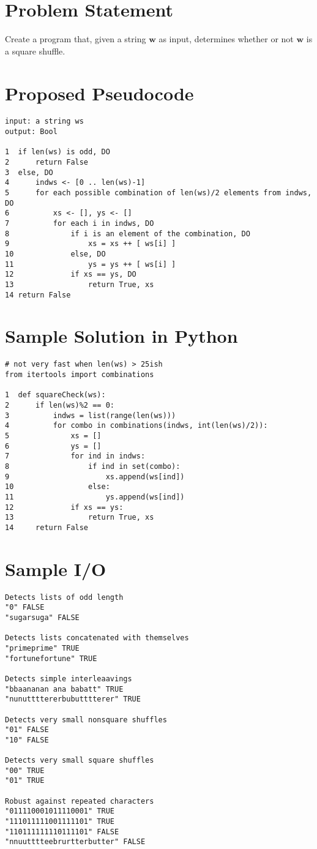 \documentclass{article}[12pt]
\begin{document}
\section{Problem Statement}

Create a program that, given a string $\mathbf{w}$ as input, determines whether or not $\mathbf{w}$ is a square shuffle.


\newpage \section{Proposed Pseudocode}

\begin{verbatim}
input: a string ws
output: Bool

1  if len(ws) is odd, DO
2      return False
3  else, DO
4      indws <- [0 .. len(ws)-1]
5      for each possible combination of len(ws)/2 elements from indws, DO
6          xs <- [], ys <- []
7          for each i in indws, DO
8              if i is an element of the combination, DO
9                  xs = xs ++ [ ws[i] ]
10             else, DO
11                 ys = ys ++ [ ws[i] ]
12             if xs == ys, DO
13                 return True, xs
14 return False
\end{verbatim}


\section{Sample Solution in Python}

\begin{verbatim}
# not very fast when len(ws) > 25ish
from itertools import combinations

1  def squareCheck(ws):
2      if len(ws)%2 == 0:
3          indws = list(range(len(ws)))
4          for combo in combinations(indws, int(len(ws)/2)):
5              xs = []
6              ys = []
7              for ind in indws:
8                  if ind in set(combo):
9                      xs.append(ws[ind])
10                 else:
11                     ys.append(ws[ind])
12             if xs == ys:
13                 return True, xs
14     return False
\end{verbatim}


\newpage \section{Sample I/O}

\begin{verbatim}
Detects lists of odd length
"0" FALSE
"sugarsuga" FALSE

Detects lists concatenated with themselves
"primeprime" TRUE
"fortunefortune" TRUE

Detects simple interleaavings
"bbaananan ana babatt" TRUE
"nunuttttererbubutttterer" TRUE

Detects very small nonsquare shuffles
"01" FALSE
"10" FALSE

Detects very small square shuffles
"00" TRUE
"01" TRUE

Robust against repeated characters
"011110001011110001" TRUE
"111011111001111101" TRUE
"110111111110111101" FALSE
"nnuutttteebrurtterbutter" FALSE
\end{verbatim}
\end{document}
